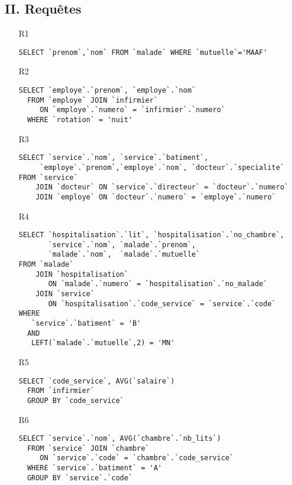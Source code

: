 \subsection*{II. Requêtes}
\begin{enumerate}
  \item[R1] 
\begin{verbatim}
SELECT `prenom`,`nom` FROM `malade` WHERE `mutuelle`='MAAF'
\end{verbatim}

  \item[R2]
\begin{verbatim}
SELECT `employe`.`prenom`, `employe`.`nom` 
  FROM `employe` JOIN `infirmier` 
     ON `employe`.`numero` = `infirmier`.`numero` 
  WHERE `rotation` = 'nuit'
\end{verbatim}

  \item[R3]
\begin{verbatim}
SELECT `service`.`nom`, `service`.`batiment`, 
     `employe`.`prenom`,`employe`.`nom`, `docteur`.`specialite`
FROM `service` 
    JOIN `docteur` ON `service`.`directeur` = `docteur`.`numero`
    JOIN `employe` ON `docteur`.`numero` = `employe`.`numero`
\end{verbatim}

  \item[R4]
\begin{verbatim}
SELECT `hospitalisation`.`lit`, `hospitalisation`.`no_chambre`,
       `service`.`nom`, `malade`.`prenom`, 
       `malade`.`nom`,  `malade`.`mutuelle` 
FROM `malade`
    JOIN `hospitalisation` 
       ON `malade`.`numero` = `hospitalisation`.`no_malade`
    JOIN `service`
       ON `hospitalisation`.`code_service` = `service`.`code` 
WHERE 
   `service`.`batiment` = 'B'
  AND
   LEFT(`malade`.`mutuelle`,2) = 'MN'
\end{verbatim}

  \item[R5]
\begin{verbatim}
SELECT `code_service`, AVG(`salaire`) 
  FROM `infirmier` 
  GROUP BY `code_service`
\end{verbatim}

  \item[R6]
\begin{verbatim}
SELECT `service`.`nom`, AVG(`chambre`.`nb_lits`)
  FROM `service` JOIN `chambre`
     ON `service`.`code` = `chambre`.`code_service`
  WHERE `service`.`batiment` = 'A'
  GROUP BY `service`.`code`
\end{verbatim}


\end{enumerate}
